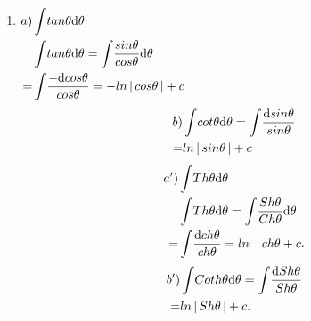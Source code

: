 \documentclass{amsbook}
\begin{document}
\begin{multicols}{2}
\begin{enumerate}
\item
$
\!
\begin{aligned}[t]
 a)&\int \! tan\theta \mathrm{d} \theta\\
&\int \! tan\theta \mathrm{d} \theta =\int \! \frac{sin\theta}{cos\theta}\mathrm{d} \theta\\
=& \int \! \frac{-\mathrm{d} cos\theta}{cos\theta}=-ln\left \lvert \, cos\theta \, \right \rvert+c\\
\end{aligned}
$ 
\begin{align*}
b)&\int \! cot\theta \mathrm{d} \theta = \int \! \frac{\mathrm{d} sin\theta}{sin\theta}\\
=&ln\left \lvert \, sin\theta \, \right \rvert+c\\
\end{align*}
\begin{align*}
a')&\int \! Th\theta \mathrm{d} \theta\\
&\int \! Th\theta \mathrm{d} \theta = \int \! \frac{Sh\theta}{Ch\theta} \mathrm{d} \theta\\
=&\int \! \frac{\mathrm{d} ch\theta}{ch\theta}=ln\quad ch\theta+c.\\
\end{align*}
\begin{align*}
b')&\int \! Coth\theta \mathrm{d} \theta = \int \! \frac{\mathrm{d} Sh\theta}{Sh\theta}\\
=&ln\left \lvert \, Sh\theta \, \right \rvert+c.\\
\end{align*}
\end{enumerate}
\end{multicols}
\end{document}
